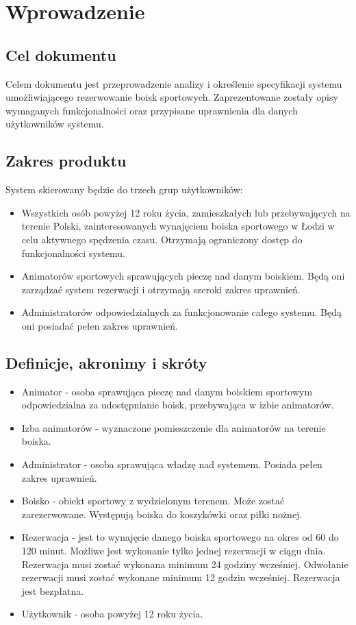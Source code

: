 \documentclass[a4paper,11pt]{article}
\begin{document}
\section {Wprowadzenie}

\subsection {Cel dokumentu}
Celem dokumentu jest przeprowadzenie analizy i określenie specyfikacji systemu umożliwiającego rezerwowanie boisk sportowych. Zaprezentowane zostały opisy wymaganych funkcjonalności oraz przypisane uprawnienia dla danych użytkowników systemu.

\subsection {Zakres produktu}
System skierowany będzie do trzech grup użytkowników:
\begin{itemize}
	\item Wszystkich osób powyżej 12 roku życia, zamieszkałych lub przebywających na terenie Polski, zainteresowanych wynajęciem boiska sportowego w Łodzi w celu aktywnego spędzenia czasu. Otrzymają ograniczony dostęp do funkcjonalności systemu.
	\item Animatorów sportowych sprawujących pieczę nad danym boiskiem. Będą oni zarządzać system rezerwacji i otrzymają szeroki zakres uprawnień.
	\item Administratorów odpowiedzialnych za funkcjonowanie całego systemu. Będą oni posiadać pełen zakres uprawnień.
\end{itemize}

\subsection {Definicje, akronimy i skróty}
\begin{itemize}
	\item Animator - osoba sprawująca pieczę nad danym boiskiem sportowym odpowiedzialna za udostępnianie boisk, przebywająca w izbie animatorów.
	\item Izba animatorów - wyznaczone pomieszczenie dla animatorów na terenie boiska.
	\item Administrator - osoba sprawująca władzę nad systemem. Posiada pełen zakres uprawnień.
	\item Boisko - obiekt sportowy z wydzielonym terenem. Może zostać zarezerwowane. Występują boiska do koszykówki oraz piłki nożnej.
	\item Rezerwacja - jest to wynajęcie danego boiska sportowego na okres od 60 do 120 minut. Możliwe jest wykonanie tylko jednej rezerwacji w ciągu dnia. Rezerwacja musi zostać wykonana minimum 24 godziny wcześniej. Odwołanie rezerwacji musi zostać wykonane minimum 12 godzin wcześniej. Rezerwacja jest bezpłatna.
	\item Użytkownik - osoba powyżej 12 roku życia.
\end{itemize}
\end{document}
